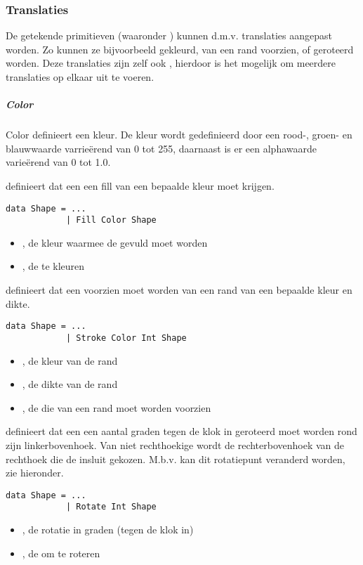 \subsubsection{Translaties}
De getekende primitieven (waaronder ) kunnen d.m.v. translaties aangepast worden. Zo kunnen ze bijvoorbeeld gekleurd, van een rand voorzien, of geroteerd worden. Deze translaties zijn zelf ook \shapes, hierdoor is het mogelijk om meerdere translaties op elkaar uit te voeren. 

\subparagraph{Color}
Color definieert een kleur. De kleur wordt gedefinieerd door een rood-, groen- en blauwwaarde varrieërend van 0 tot 255, daarnaast is er een alphawaarde varieërend van 0 tot 1.0.  

 definieert dat een \shape een fill van een bepaalde kleur moet krijgen. 
\begin{lstlisting}
data Shape = ...
			| Fill Color Shape
\end{lstlisting}
\begin{itemize}
	\item {}, de kleur waarmee de \shape gevuld moet worden
	\item {}, de te kleuren \shape
\end{itemize}

 definieert dat een \shape voorzien moet worden van een rand van een bepaalde kleur en dikte.
\begin{lstlisting}
data Shape = ...
			| Stroke Color Int Shape
\end{lstlisting}
\begin{itemize}
	\item {}, de kleur van de rand
	\item {}, de dikte van de rand
	\item {}, de \shape die van een rand moet worden voorzien
\end{itemize}

 definieert dat een \shape een aantal graden tegen de klok in geroteerd moet worden rond zijn linkerbovenhoek. Van niet rechthoekige \shapes wordt de rechterbovenhoek van de rechthoek die de \shape insluit gekozen. M.b.v.  kan dit rotatiepunt veranderd worden, zie hieronder.
\begin{lstlisting}
data Shape = ...
			| Rotate Int Shape
\end{lstlisting}
\begin{itemize}
	\item {}, de rotatie in graden (tegen de klok in)
	\item {}, de \shape om te roteren
\end{itemize}

